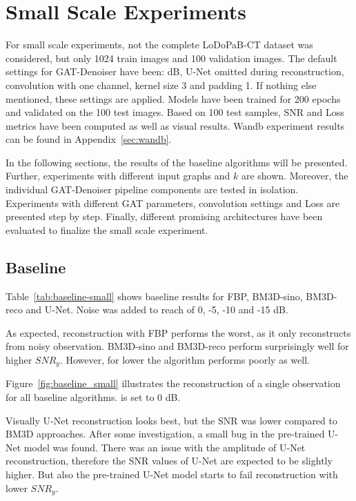 \section{Small Scale Experiments}
For small scale experiments, not the complete LoDoPaB-CT dataset was considered, but only 1024 train images
and 100 validation images. 
The default settings for GAT-Denoiser have been:  dB, U-Net omitted during reconstruction, 
convolution with one channel, kernel size 3 and padding 1. 
If nothing else mentioned, these settings are applied.
Models have been trained for 200 epochs and validated on the 100 test images. Based on 100 test samples,
SNR and Loss metrics have been computed as well as visual results. 
Wandb experiment results can be found in Appendix~\ref{sec:wandb}.

In the following sections, the results of the baseline algorithms will be presented.
Further, experiments with different input graphs and $k$ are shown. 
Moreover, the individual GAT-Denoiser pipeline components are tested in isolation.
Experiments with different GAT parameters, convolution settings and Loss are presented step by step.
Finally, different promising architectures have been evaluated to finalize the small scale experiment.


\subsection{Baseline}

Table~\ref{tab:baseline-small} shows baseline results for FBP, BM3D-sino, BM3D-reco and U-Net.
Noise was added to reach \snry of 0, -5, -10 and -15 dB.

As expected, reconstruction with FBP performs the worst, as it only reconstructs from noisy observation.
BM3D-sino and BM3D-reco perform surprisingly well for higher $\textit{SNR}_y$.
However, for lower \snry the algorithm performs poorly as well.

Figure~\ref{fig:baseline_small} illustrates the reconstruction of a single
observation for all baseline algorithms. \snry is set to 0 dB.

Visually U-Net reconstruction looks best, but the SNR was lower compared to BM3D approaches.
After some investigation, a small bug in the pre-trained U-Net model was found.
There was an issue with the amplitude of U-Net reconstruction,
therefore the SNR values of U-Net are expected to be slightly higher.
But also the pre-trained U-Net model starts to fail reconstruction with lower $\textit{SNR}_y$.


